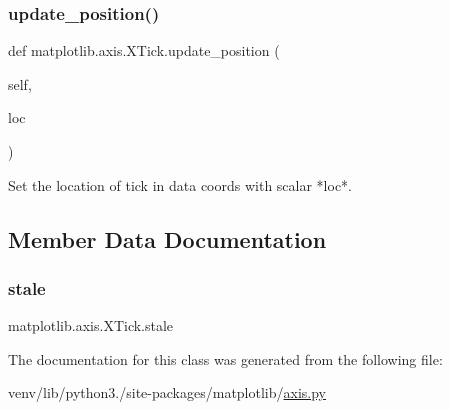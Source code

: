 \mbox{\label{classmatplotlib_1_1axis_1_1XTick_a44e7a90814912ec49f68e7e452107d8a}} 
\subsubsection{\texorpdfstring{update\+\_\+position()}{update\_position()}}
{\footnotesize\ttfamily def matplotlib.\+axis.\+X\+Tick.\+update\+\_\+position (\begin{DoxyParamCaption}\item[{}]{self,  }\item[{}]{loc }\end{DoxyParamCaption})}

\begin{DoxyVerb}Set the location of tick in data coords with scalar *loc*.\end{DoxyVerb}
 

\subsection{Member Data Documentation}
\mbox{\label{classmatplotlib_1_1axis_1_1XTick_aa2bfb2742747701a38c07851004acd4d}} 
\subsubsection{\texorpdfstring{stale}{stale}}
{\footnotesize\ttfamily matplotlib.\+axis.\+X\+Tick.\+stale}



The documentation for this class was generated from the following file\+:\begin{DoxyCompactItemize}
\item 
venv/lib/python3./site-\/packages/matplotlib/\hyperlink{axis_8py}{axis.\+py}\end{DoxyCompactItemize}
